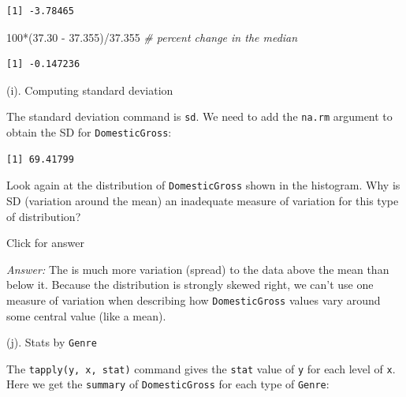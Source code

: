 \documentclass[
]{book}
\newenvironment{Shaded}{\begin{snugshade}}{\end{snugshade}}
\newcommand{\AttributeTok}[1]{\textcolor[rgb]{0.77,0.63,0.00}{#1}}
\newcommand{\CommentTok}[1]{\textcolor[rgb]{0.56,0.35,0.01}{\textit{#1}}}
\newcommand{\ConstantTok}[1]{\textcolor[rgb]{0.00,0.00,0.00}{#1}}
\newcommand{\DecValTok}[1]{\textcolor[rgb]{0.00,0.00,0.81}{#1}}
\newcommand{\FloatTok}[1]{\textcolor[rgb]{0.00,0.00,0.81}{#1}}
\newcommand{\FunctionTok}[1]{\textcolor[rgb]{0.00,0.00,0.00}{#1}}
\newcommand{\NormalTok}[1]{#1}
\newcommand{\SpecialCharTok}[1]{\textcolor[rgb]{0.00,0.00,0.00}{#1}}
\begin{document}
\begin{verbatim}
[1] -3.78465
\end{verbatim}

\begin{Shaded}
\begin{Highlighting}[]
\DecValTok{100}\SpecialCharTok{*}\NormalTok{(}\FloatTok{37.30} \SpecialCharTok{{-}} \FloatTok{37.355}\NormalTok{)}\SpecialCharTok{/}\FloatTok{37.355} \CommentTok{\# percent change in the median}
\end{Highlighting}
\end{Shaded}

\begin{verbatim}
[1] -0.147236
\end{verbatim}

(i). Computing standard deviation

The standard deviation command is \texttt{sd}. We need to add the \texttt{na.rm} argument to obtain the SD for \texttt{DomesticGross}:

\begin{Shaded}
\end{Shaded}

\begin{verbatim}
[1] 69.41799
\end{verbatim}

Look again at the distribution of \texttt{DomesticGross} shown in the histogram. Why is SD (variation around the mean) an inadequate measure of variation for this type of distribution?

Click for answer

\emph{Answer:} The is much more variation (spread) to the data above the mean than below it. Because the distribution is strongly skewed right, we can't use one measure of variation when describing how \texttt{DomesticGross} values vary around some central value (like a mean).

(j). Stats by \texttt{Genre}

The \texttt{tapply(y,\ x,\ stat)} command gives the \texttt{stat} value of \texttt{y} for each level of \texttt{x}. Here we get the \texttt{summary} of \texttt{DomesticGross} for each type of \texttt{Genre}:

\begin{Shaded}
\end{Shaded}
\end{document}
